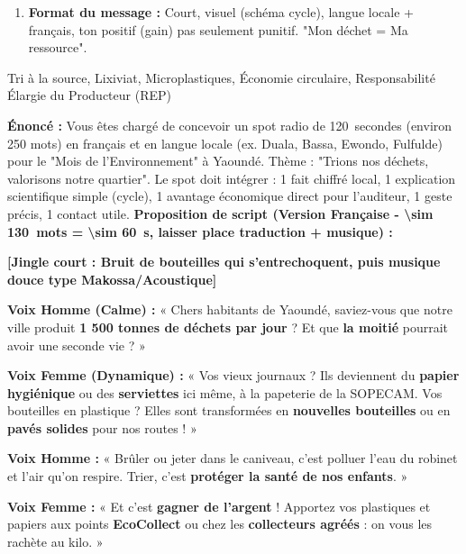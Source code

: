 \documentclass[11pt]{article}
\newcommand{\cle}[1]{{\popxbold\color{popdark}#1}}
\begin{document}
\begin{methode}
\begin{enumerate}
\begin{enumerate}
        \item Refus sacs plastiques interdits (\SI{< 60}{\mu m}), adoption sacs réutilisables.
        \item Signalement dépôts sauvages (numéro vert / appli).
    \end{enumerate}
    \item \textbf{Format du message :} Court, visuel (schéma cycle), langue locale + français, ton positif (gain) pas seulement punitif. "Mon déchet = Ma ressource".
\end{enumerate}
\cle{Tri à la source}, \cle{Lixiviat}, \cle{Microplastiques}, \cle{Économie circulaire}, \cle{Responsabilité Élargie du Producteur (REP)}
\end{methode}

\begin{exoresolu}
\textbf{Énoncé :} Vous êtes chargé de concevoir un spot radio de \SI{120}{secondes} (environ 250 mots) en français et en langue locale (ex. Duala, Bassa, Ewondo, Fulfulde) pour le "Mois de l'Environnement" à Yaoundé. Thème : "Trions nos déchets, valorisons notre quartier". Le spot doit intégrer : 1 fait chiffré local, 1 explication scientifique simple (cycle), 1 avantage économique direct pour l'auditeur, 1 geste précis, 1 contact utile.
\tcblower
\textbf{Proposition de script (Version Française - \SI{\sim 130}{mots} = \SI{\sim 60}{s}, laisser place traduction + musique) :}

\textbf{[Jingle court : Bruit de bouteilles qui s'entrechoquent, puis musique douce type Makossa/Acoustique]}

\textbf{Voix Homme (Calme) :} « Chers habitants de Yaoundé, saviez-vous que notre ville produit \textbf{1 500 tonnes de déchets par jour} ? Et que \textbf{la moitié} pourrait avoir une seconde vie ? »

\textbf{Voix Femme (Dynamique) :} « Vos vieux journaux ? Ils deviennent du \textbf{papier hygiénique} ou des \textbf{serviettes} ici même, à la papeterie de la SOPECAM. Vos bouteilles en plastique ? Elles sont transformées en \textbf{nouvelles bouteilles} ou en \textbf{pavés solides} pour nos routes ! »

\textbf{Voix Homme :} « Brûler ou jeter dans le caniveau, c'est polluer l'eau du robinet et l'air qu'on respire. Trier, c'est \textbf{protéger la santé de nos enfants}. »

\textbf{Voix Femme :} « Et c'est \textbf{gagner de l'argent} ! Apportez vos plastiques et papiers aux points \textbf{EcoCollect} ou chez les \textbf{collecteurs agréés} : on vous les rachète au kilo. »


\end{exoresolu}
\end{document}
